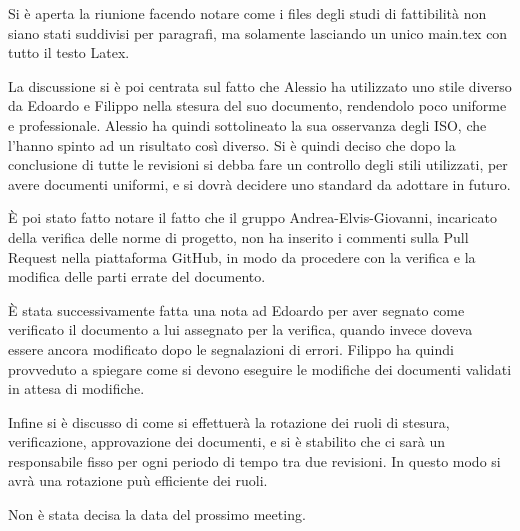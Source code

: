 Si è aperta la riunione facendo notare come i files degli studi di fattibilità non siano stati suddivisi per paragrafi,
ma solamente lasciando un unico main.tex con tutto il testo Latex.

La discussione si è poi centrata sul fatto che Alessio ha utilizzato uno stile diverso da Edoardo e Filippo nella stesura
del suo documento, rendendolo poco uniforme e professionale. Alessio ha quindi sottolineato la sua osservanza degli ISO, che l'hanno spinto ad un risultato così diverso. 
Si è quindi deciso che dopo la conclusione di tutte le revisioni si debba fare un controllo degli stili utilizzati, per avere documenti uniformi, e si dovrà decidere uno standard da adottare in futuro.

È poi stato fatto notare il fatto che il gruppo Andrea-Elvis-Giovanni, incaricato della verifica delle norme di progetto, non ha inserito i commenti
sulla Pull Request nella piattaforma GitHub, in modo da procedere con la verifica e la modifica delle parti errate del documento.

È stata successivamente fatta una nota ad Edoardo per aver segnato come verificato il documento a lui assegnato per la verifica, quando invece doveva essere
ancora modificato dopo le segnalazioni di errori. Filippo ha quindi provveduto a spiegare come si devono eseguire le modifiche dei documenti validati in attesa di modifiche.

Infine si è discusso di come si effettuerà la rotazione dei ruoli di stesura, verificazione, approvazione dei documenti, e si è stabilito che ci sarà un responsabile
fisso per ogni periodo di tempo tra due revisioni. In questo modo si avrà una rotazione puù efficiente dei ruoli.

Non è stata decisa la data del prossimo meeting.